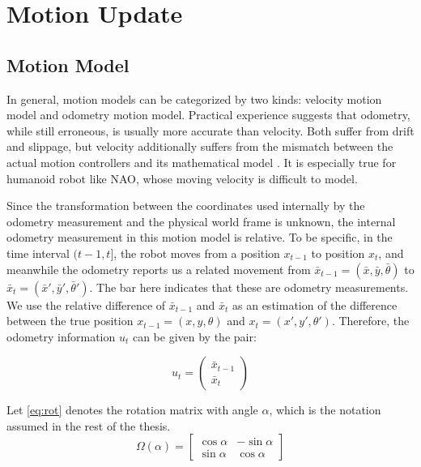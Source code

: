 \section{Motion Update}\label{sec:Motion Update}
\subsection{Motion Model}\label{sub:Motion Model}
In general, motion models can be categorized by two kinds: velocity motion model and odometry motion model. Practical experience suggests that odometry, while still erroneous, is usually more accurate than velocity. Both suffer from drift and slippage, but velocity additionally suffers from the mismatch between the actual motion controllers and its mathematical model \cite{thrun2005probabilistic}. It is especially true for humanoid robot like NAO, whose moving velocity is difficult to model. 

Since the transformation between the coordinates used internally by the odometry measurement and the physical world frame is unknown, the internal odometry measurement in this motion model is relative. 
To be specific, in the time interval $(t-1, t]$, the robot moves from a position $x_{t-1}$ to position $x_t$, and meanwhile the odometry reports us a related movement from $\bar{x}_{t-1} = (\bar{x}, \bar{y}, \bar{\theta})$ to $\bar{x}_{t} = (\bar{x}', \bar{y}', \bar{\theta}')$. The bar here indicates that these are odometry measurements. We use the relative difference of $\bar{x}_{t-1}$ and $\bar{x}_{t}$ as an estimation of the difference between the true position $x_{t-1} = (x, y, \theta)$ and $x_t = (x', y', \theta')$. Therefore, the odometry information $u_t$ can be given by the pair:

\begin{equation}\label{eq:ut}
u_t = \begin{pmatrix}
\bar{x}_{t-1}\\ 
\bar{x}_{t}
\end{pmatrix}
\end{equation}

Let \autoref{eq:rot} denotes the rotation matrix with angle $\alpha$, which is the notation assumed in the rest of the thesis. 
\begin{equation}\label{eq:rot}
\Omega(\alpha) = \begin{bmatrix}
\cos{\alpha} &  -\sin{\alpha} \\
\sin{\alpha} &  \cos{\alpha}
\end{bmatrix}
\end{equation}

